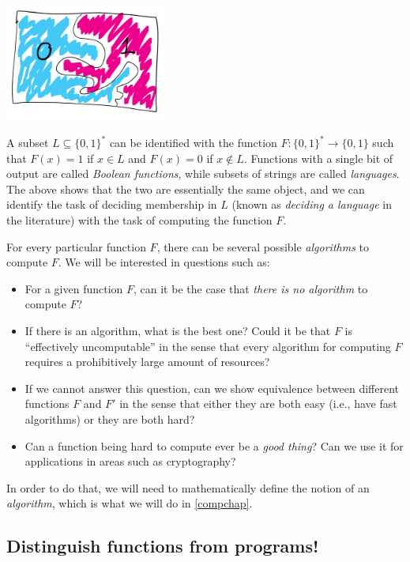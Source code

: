 \begin{marginfigure}
\centering
\includegraphics[width=\linewidth, height=1.5in, keepaspectratio]{../figure/booleanfunc.png}
\caption{A subset \(L \subseteq \{0,1\}^*\) can be identified with the
function \(F:\{0,1\}^* \rightarrow \{0,1\}\) such that \(F(x)=1\) if
\(x\in L\) and \(F(x)=0\) if \(x\not\in L\). Functions with a single bit
of output are called \emph{Boolean functions}, while subsets of strings
are called \emph{languages}. The above shows that the two are
essentially the same object, and we can identify the task of deciding
membership in \(L\) (known as \emph{deciding a language} in the
literature) with the task of computing the function \(F\).}
\label{booleanlangfig}
\end{marginfigure}

For every particular function \(F\), there can be several possible
\emph{algorithms} to compute \(F\). We will be interested in questions
such as:

\begin{itemize}
\item
  For a given function \(F\), can it be the case that \emph{there is no
  algorithm} to compute \(F\)?
\item
  If there is an algorithm, what is the best one? Could it be that \(F\)
  is ``effectively uncomputable'' in the sense that every algorithm for
  computing \(F\) requires a prohibitively large amount of resources?
\item
  If we cannot answer this question, can we show equivalence between
  different functions \(F\) and \(F'\) in the sense that either they are
  both easy (i.e., have fast algorithms) or they are both hard?
\item
  Can a function being hard to compute ever be a \emph{good thing}? Can
  we use it for applications in areas such as cryptography?
\end{itemize}

In order to do that, we will need to mathematically define the notion of
an \emph{algorithm}, which is what we will do in \cref{compchap}.

\subsection{Distinguish functions from programs!}\label{secimplvsspec}

